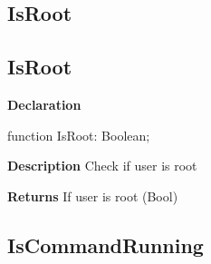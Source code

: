 \documentclass{report}
\newif\ifpdf
\begin{document}
\subsection*{\large{\textbf{IsRoot}}\normalsize\hspace{1ex}\hrulefill}
\else
\subsection*{IsRoot}
\fi
\label{distri-IsRoot}
\begin{list}{}{
\setlength{\itemindent}{0cm}
\setlength{\listparindent}{0cm}
\setlength{\leftmargin}{\evensidemargin}
\addtolength{\leftmargin}{\tmplength}
\settowidth{\labelsep}{X}
\addtolength{\leftmargin}{\labelsep}
\setlength{\labelwidth}{\tmplength}
}
\item[\textbf{Declaration}\hfill]
\ifpdf
\begin{flushleft}
\fi
\begin{ttfamily}
function IsRoot: Boolean;\end{ttfamily}

\ifpdf
\end{flushleft}
\fi

\par
\item[\textbf{Description}]
Check if user is root \par
\item[\textbf{Returns}]If user is root (Bool)


\end{list}
\ifpdf
\subsection*{\large{\textbf{IsCommandRunning}}\normalsize\hspace{1ex}\hrulefill}
\else
\end{document}
